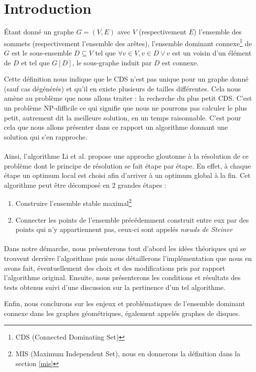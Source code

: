 \section{Introduction}
Étant donné un graphe $G=(V, E)$ avec $V$ (respectivement $E$) l'ensemble des sommets (respectivement l'ensemble des arêtes), l'ensemble dominant connexe\footnote{CDS (Connected Dominating Set)} de $G$ est le sous-ensemble $D \subseteq V$ tel que $\forall v \in V, v \in D \lor v$ est un voisin d'un élément de $D$ et tel que $G[D]$, le sous-graphe induit par $D$ est connexe.

Cette définition nous indique que le CDS n'est pas unique pour un graphe donné (sauf cas dégénérés) et qu'il en existe plusieurs de tailles différentes. Cela nous amène au problème que nous allons traiter : la recherche du plus petit CDS. C'est un problème NP-difficile ce qui signifie que nous ne pourrons pas calculer le plus petit, autrement dit la meilleure solution, en un temps raisonnable. C'est pour cela que nous allons présenter dans ce rapport un algorithme donnant une solution qui s'en rapproche. 

\paragraph{}
Ainsi, l'algorithme Li et al. propose une approche gloutonne à la résolution de ce problème dont le principe de résolution se fait étape par étape. En effet, à chaque étape un optimum local est choisi afin d'arriver à un optimum global à la fin.
Cet algorithme peut être décomposé en 2 grandes étapes :
\begin{enumerate}
\item Construire l'ensemble stable maximal\footnote{MIS (Maximum Independent Set), nous en donnerons la définition dans la section \ref{mis}}
\item Connecter les points de l'ensemble précédemment construit entre eux par des points qui n'y appartiennent pas, ceux-ci sont appelés \textit{n\oe uds de Steiner}
\end{enumerate}

\paragraph{}
Dans notre démarche, nous présenterons tout d'abord les idées théoriques qui se trouvent derrière l'algorithme puis nous détaillerons l'implémentation que nous en avons fait, éventuellement des choix et des modifications pris par rapport l'algorithme original. Ensuite, nous présenterons les conditions et résultats des tests obtenus suivi d'une discussion sur la pertinence d'un tel algorithme.

Enfin, nous conclurons sur les enjeux et problématiques de l'ensemble dominant connexe dans les graphes géométriques, également appelés graphes de disques.